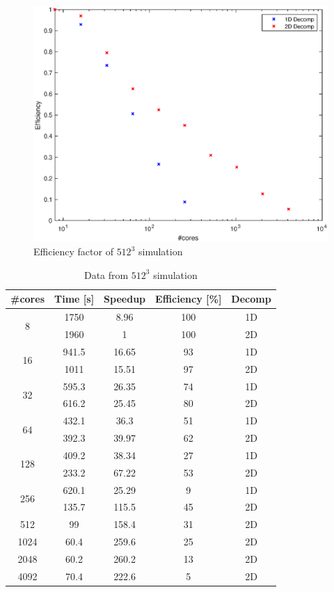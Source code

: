 \begin{figure}
\begin{center}
\includegraphics[scale=0.6]{grafici/5123}
\caption{Efficiency factor of $512^3$ simulation}
\label{5123}
\end{center}
\end{figure}


\begin{table}[h]
\caption{Data from $512^{3}$ simulation}
\begin{center}
\begin{tabular}{c c c c c}
\toprule
\textbf{\#cores} & \textbf{Time [s]} & \textbf{Speedup} & \textbf{Efficiency [\%]} & \textbf{Decomp}\\
\midrule
\multirow{2}{*}{8} & 1750 & 8.96 & 100 &1D\\
& 1960 & 1 & 100 & 2D\\
\hline
\multirow{2}{*}{16} & 941.5 & 16.65 & 93 & 1D\\
& 1011 & 15.51 & 97 & 2D\\
\hline
\multirow{2}{*}{32} & 595.3 & 26.35 & 74 & 1D\\
& 616.2 & 25.45 & 80 & 2D\\
\hline
\multirow{2}{*}{64} & 432.1 & 36.3 & 51 & 1D\\
& 392.3 & 39.97 & 62 & 2D\\
\hline
\multirow{2}{*}{128} & 409.2 & 38.34 & 27 & 1D\\
& 233.2 & 67.22 & 53 & 2D\\
\hline
\multirow{2}{*}{256} & 620.1 & 25.29 & 9 & 1D\\
& 135.7 & 115.5 & 45 & 2D\\
\hline
512 & 99 & 158.4 & 31 & 2D\\
1024 & 60.4 & 259.6 & 25  & 2D \\
2048 & 60.2 & 260.2 & 13  & 2D \\
4092 & 70.4 & 222.6 & 5 & 2D\\
\bottomrule
\end{tabular}
\end{center}
\label{512data}
\end{table}%